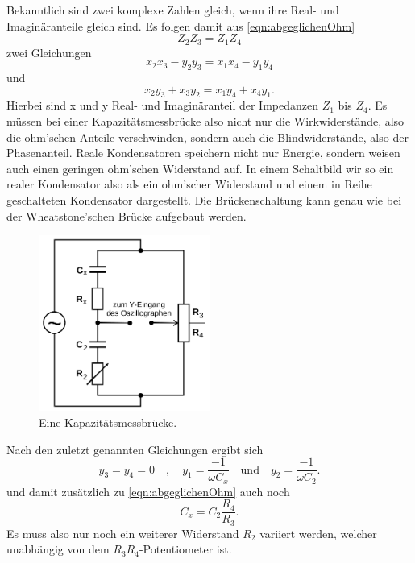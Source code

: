 Bekanntlich sind zwei komplexe Zahlen gleich, wenn ihre Real- und Imaginäranteile gleich sind.
Es folgen damit aus \ref{eqn:abgeglichenOhm}
\begin{equation*}
    Z_2Z_3 = Z_1Z_4
\end{equation*} zwei Gleichungen
\begin{equation}
    x_2x_3 - y_2y_3 = x_1x_4 - y_1y_4
\end{equation}
und
\begin{equation}
    x_2y_3 + x_3y_2 = x_1y_4 + x_4y_1  .
\end{equation}
Hierbei sind x und y Real- und Imaginäranteil der Impedanzen $Z_1$ bis $Z_4$.
Es müssen bei einer Kapazitätsmessbrücke also nicht nur die Wirkwiderstände, also die ohm'schen Anteile verschwinden, sondern 
auch die Blindwiderstände, also der Phasenanteil.
Reale Kondensatoren speichern nicht nur Energie, sondern weisen auch einen geringen ohm'schen Widerstand auf. In einem Schaltbild
wir so ein realer Kondensator also als ein ohm'scher Widerstand und einem in Reihe geschalteten Kondensator dargestellt.
Die Brückenschaltung kann genau wie bei der Wheatstone'schen Brücke aufgebaut werden.
\begin{figure}
    \centering
    \includegraphics[width=0.5\textwidth]{plots/kapazität.png}
    \caption{Eine Kapazitätsmessbrücke.}
    \label{fig:Kapazität}
\end{figure}
Nach den zuletzt genannten Gleichungen ergibt sich
\begin{equation*}
    y_3 = y_4 = 0
    \quad\mathrm{,}\quad
    y_1 = \frac{-1}{\omega C_x}
    \quad\mathrm{und}\quad 
    y_2 = \frac{-1}{\omega C_2} .
\end{equation*}
und damit zusätzlich zu \ref{eqn:abgeglichenOhm} auch noch 
\begin{equation}
    C_x = C_2\frac{R_4}{R_3} .
    \label{eqn:abgeglKapaz}
\end{equation}
Es muss also nur noch ein weiterer Widerstand $R_2$ variiert werden, welcher unabhängig von dem $R_3R_4$-Potentiometer ist.

